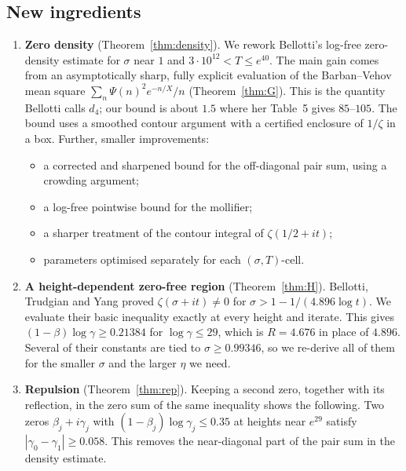 \subsection*{New ingredients}
\begin{enumerate}
\item \textbf{Zero density} (Theorem~\ref{thm:density}).
  We rework Bellotti's log-free zero-density estimate \cite{Bellotti} for $\sigma$ near $1$ and $3\cdot 10^{12} < T \le e^{40}$.
  The main gain comes from an asymptotically sharp, fully explicit evaluation of the Barban--Vehov mean square $\sum_n \Psi(n)^2 e^{-n/X}/n$ (Theorem~\ref{thm:G}).
  This is the quantity Bellotti calls $d_4$; our bound is about $1.5$ where her Table~5 gives $85$--$105$.
  The bound uses a smoothed contour argument with a certified enclosure of $1/\zeta$ in a box.
  Further, smaller improvements:
  \begin{itemize}
  \item a corrected and sharpened bound for the off-diagonal pair sum, using a crowding argument;
  \item a log-free pointwise bound for the mollifier;
  \item a sharper treatment of the contour integral of $\zeta(1/2+it)$;
  \item parameters optimised separately for each $(\sigma,T)$-cell.
  \end{itemize}
\item \textbf{A height-dependent zero-free region} (Theorem~\ref{thm:H}).
  Bellotti, Trudgian and Yang \cite{BTY} proved $\zeta(\sigma+it)\neq 0$ for $\sigma > 1 - 1/(4.896\log t)$.
  We evaluate their basic inequality exactly at every height and iterate.
  This gives $(1-\beta)\log\gamma \ge 0.21384$ for $\log\gamma \le 29$, which is $R = 4.676$ in place of $4.896$.
  Several of their constants are tied to $\sigma \ge 0.99346$, so we re-derive all of them for the smaller $\sigma$ and the larger $\eta$ we need.
\item \textbf{Repulsion} (Theorem~\ref{thm:rep}).
  Keeping a second zero, together with its reflection, in the zero sum of the same inequality shows the following.
  Two zeros $\beta_j+i\gamma_j$ with $(1-\beta_j)\log\gamma_j \le 0.35$ at heights near $e^{29}$ satisfy $|\gamma_0-\gamma_1| \ge 0.058$.
  This removes the near-diagonal part of the pair sum in the density estimate.
\end{enumerate}

